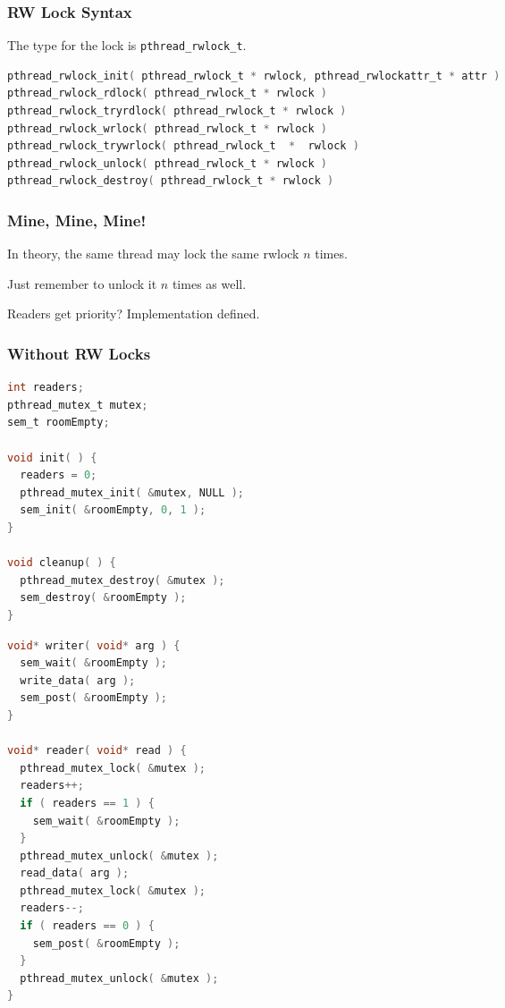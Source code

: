 \begin{frame}[fragile]
\frametitle{RW Lock Syntax}

The type for the lock is \texttt{pthread\_rwlock\_t}. 


\begin{lstlisting}[language=C]
pthread_rwlock_init( pthread_rwlock_t * rwlock, pthread_rwlockattr_t * attr )
pthread_rwlock_rdlock( pthread_rwlock_t * rwlock )
pthread_rwlock_tryrdlock( pthread_rwlock_t * rwlock )
pthread_rwlock_wrlock( pthread_rwlock_t * rwlock )
pthread_rwlock_trywrlock( pthread_rwlock_t  *  rwlock )
pthread_rwlock_unlock( pthread_rwlock_t * rwlock )
pthread_rwlock_destroy( pthread_rwlock_t * rwlock )
\end{lstlisting}



\end{frame}


\begin{frame}
\frametitle{Mine, Mine, Mine!}

In theory, the same thread may lock the same rwlock $n$ times.

Just remember to unlock it $n$ times as well.

Readers get priority? Implementation defined.

\end{frame}


\begin{frame}[fragile]
\frametitle{Without RW Locks}

\begin{multicols}{2}
\begin{lstlisting}[language=C]
int readers;
pthread_mutex_t mutex;
sem_t roomEmpty;

void init( ) {
  readers = 0;
  pthread_mutex_init( &mutex, NULL );
  sem_init( &roomEmpty, 0, 1 );
}

void cleanup( ) {
  pthread_mutex_destroy( &mutex );
  sem_destroy( &roomEmpty );
}
\end{lstlisting}

\columnbreak

\begin{lstlisting}[language=C]
void* writer( void* arg ) {
  sem_wait( &roomEmpty );
  write_data( arg );
  sem_post( &roomEmpty );
}

void* reader( void* read ) {
  pthread_mutex_lock( &mutex );
  readers++;
  if ( readers == 1 ) {
    sem_wait( &roomEmpty );
  }
  pthread_mutex_unlock( &mutex );
  read_data( arg );
  pthread_mutex_lock( &mutex );
  readers--;
  if ( readers == 0 ) {
    sem_post( &roomEmpty );
  }
  pthread_mutex_unlock( &mutex );
}
\end{lstlisting}

\end{multicols}


\end{frame}


